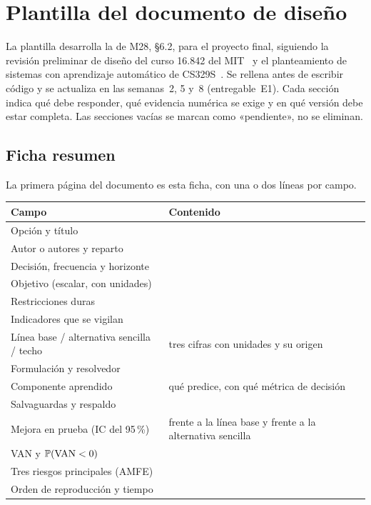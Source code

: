 \chapter{Plantilla del documento de diseño}
\label{ap:plantilla}

La plantilla desarrolla la de M28, §6.2, para el proyecto final, siguiendo la revisión preliminar de diseño del curso 16.842 del MIT~\cite{mit16842} y el planteamiento de sistemas con aprendizaje automático de CS329S~\cite{cs329s,huyen}. Se rellena antes de escribir código y se actualiza en las semanas~2, 5 y~8 (entregable~E1). Cada sección indica qué debe responder, qué evidencia numérica se exige y en qué versión debe estar completa. Las secciones vacías se marcan como «pendiente», no se eliminan.

\section{Ficha resumen}

La primera página del documento es esta ficha, con una o dos líneas por campo.

\begin{center}
\small
\begin{tabularx}{\textwidth}{@{}>{\raggedright\arraybackslash}p{4.6cm}X@{}}
\toprule
Campo & Contenido \\
\midrule
Opción y título & \\
Autor o autores y reparto & \\
Decisión, frecuencia y horizonte & \\
Objetivo (escalar, con unidades) & \\
Restricciones duras & \\
Indicadores que se vigilan & \\
Línea base / alternativa sencilla / techo & tres cifras con unidades y su origen \\
Formulación y resolvedor & \\
Componente aprendido & qué predice, con qué métrica de decisión \\
Salvaguardas y respaldo & \\
Mejora en prueba (IC del 95\,\%) & frente a la línea base y frente a la alternativa sencilla \\
VAN y $\mathbb{P}(\mathrm{VAN}<0)$ & \\
Tres riesgos principales (AMFE) & \\
Orden de reproducción y tiempo & \\
\bottomrule
\end{tabularx}
\end{center}

